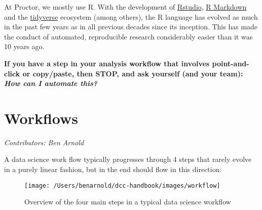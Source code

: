\documentclass[
]{book}
\begin{document}
At Proctor, we mostly use R. With the development of \href{https://rstudio.com/}{Rstudio}, \href{https://rmarkdown.rstudio.com/}{R Markdown} and the \href{https://www.tidyverse.org/}{tidyverse} ecosystem (among others), the R language has evolved as much in the past few years as in all previous decades since its inception. This has made the conduct of automated, reproducible research considerably easier than it was 10 years ago.

\textbf{If you have a step in your analysis workflow that involves point-and-click or copy/paste, then STOP, and ask yourself (and your team): } \textbf{\emph{How can I automate this?}}

\hypertarget{workflows}{%
\chapter{Workflows}\label{workflows}}

\emph{Contributors: Ben Arnold}

A data science work flow typically progresses through 4 steps that rarely evolve in a purely linear fashion, but in the end should flow in this direction:

\begin{figure}
\texttt{[image: /Users/benarnold/dcc-handbook/images/workflow]} \caption{Overview of the four main steps in a typical data science workflow}\label{fig:fig-workflow2}
\end{figure}
\end{document}
